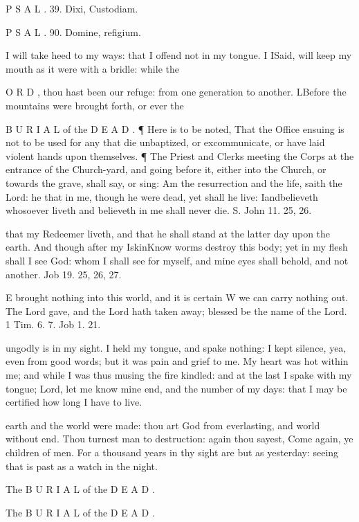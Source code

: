 P S A L . 39. Dixi, Custodiam.

P S A L . 90. Domine, refigium.

I will take heed to my ways: that I offend not in my tongue. I ISaid, will keep my mouth as it were with a bridle: while the

O R D , thou hast been our refuge: from one generation to another. LBefore the mountains were brought forth, or ever the

B U R I A L of the D E A D . ¶ Here is to be noted, That the Office ensuing is not to be used for any that die unbaptized, or excommunicate, or have laid violent hands upon themselves. ¶ The Priest and Clerks meeting the Corps at the entrance of the Church-yard, and going before it, either into the Church, or towards the grave, shall say, or sing: Am the resurrection and the life, saith the Lord: he that in me, though he were dead, yet shall he live: Iandbelieveth whosoever liveth and believeth in me shall never die. S. John 11. 25, 26.

that my Redeemer liveth, and that he shall stand at the latter day upon the earth. And though after my IskinKnow worms destroy this body; yet in my flesh shall I see God: whom I shall see for myself, and mine eyes shall behold, and not another. Job 19. 25, 26, 27.

E brought nothing into this world, and it is certain W we can carry nothing out. The Lord gave, and the Lord hath taken away; blessed be the name of the Lord. 1 Tim. 6. 7. Job 1. 21.

ungodly is in my sight. I held my tongue, and spake nothing: I kept silence, yea, even from good words; but it was pain and grief to me. My heart was hot within me; and while I was thus musing the fire kindled: and at the last I spake with my tongue; Lord, let me know mine end, and the number of my days: that I may be certified how long I have to live.

earth and the world were made: thou art God from everlasting, and world without end. Thou turnest man to destruction: again thou sayest, Come again, ye children of men. For a thousand years in thy sight are but as yesterday: seeing that is past as a watch in the night.

The B U R I A L of the D E A D .

The B U R I A L of the D E A D .

